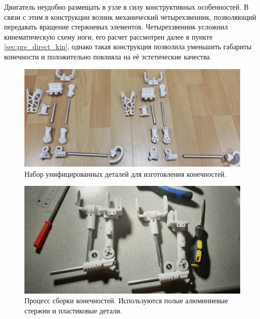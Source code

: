Двигатель неудобно размещать в узле в силу конструктивных особенностей. В связи с этим в конструкции возник механический четырехзвенник, позволяющий передавать вращение стержневых элементов. Четырехзвенник усложнил кинематическую схему ноги, его расчет рассмотрен далее в пункте \ref{sec:pre_direct_kin}, однако такая конструкция позволила уменьшить габариты конечности и положительно повлияла на её эстетические качества. 

\begin{figure}[h]
    \centering
    \includegraphics[width=\textwidth]{chapter_mechanics_construction/figure14.jpg}
    \caption{Набор унифицированных деталей для изготовления конечностей.}
    \label{fig:the_same_details}
\end{figure}

\begin{figure}[h]
    \centering
    \includegraphics[width=\textwidth]{chapter_mechanics_construction/figure12.png}
    \caption{Процесс сборки конечностей. Используются полые алюминиевые стержни и пластиковые детали.}
    \label{}
\end{figure}

